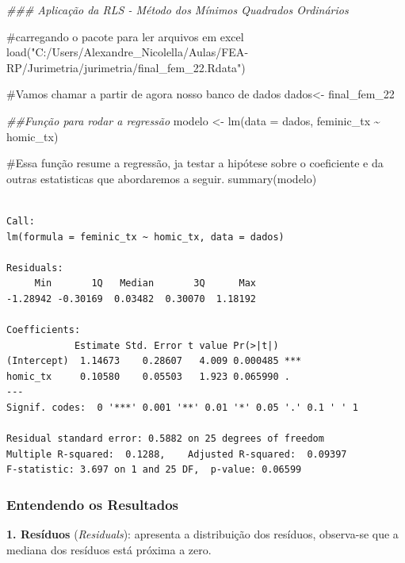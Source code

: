 \documentclass[
  letterpaper,
  DIV=11,
  numbers=noendperiod]{scrreprt}
\newenvironment{Shaded}{\begin{snugshade}}{\end{snugshade}}
\newcommand{\AttributeTok}[1]{\textcolor[rgb]{0.40,0.45,0.13}{#1}}
\newcommand{\CommentTok}[1]{\textcolor[rgb]{0.37,0.37,0.37}{#1}}
\newcommand{\DocumentationTok}[1]{\textcolor[rgb]{0.37,0.37,0.37}{\textit{#1}}}
\newcommand{\FunctionTok}[1]{\textcolor[rgb]{0.28,0.35,0.67}{#1}}
\newcommand{\NormalTok}[1]{\textcolor[rgb]{0.00,0.23,0.31}{#1}}
\newcommand{\OtherTok}[1]{\textcolor[rgb]{0.00,0.23,0.31}{#1}}
\newcommand{\SpecialCharTok}[1]{\textcolor[rgb]{0.37,0.37,0.37}{#1}}
\newcommand{\StringTok}[1]{\textcolor[rgb]{0.13,0.47,0.30}{#1}}
\begin{document}
\begin{Shaded}
\begin{Highlighting}[]
\DocumentationTok{\#\#\# Aplicação da RLS {-} Método dos Mínimos Quadrados Ordinários}

\CommentTok{\#carregando o pacote para ler arquivos em excel}
\FunctionTok{load}\NormalTok{(}\StringTok{"C:/Users/Alexandre\_Nicolella/Aulas/FEA{-}RP/Jurimetria/jurimetria/final\_fem\_22.Rdata"}\NormalTok{)}

\CommentTok{\#Vamos chamar a partir de agora nosso banco de dados}
\NormalTok{dados}\OtherTok{\textless{}{-}}\NormalTok{ final\_fem\_22 }

\DocumentationTok{\#\#Função para rodar a regressão}
\NormalTok{modelo }\OtherTok{\textless{}{-}} \FunctionTok{lm}\NormalTok{(}\AttributeTok{data =}\NormalTok{ dados, feminic\_tx }\SpecialCharTok{\textasciitilde{}}\NormalTok{ homic\_tx)}


\CommentTok{\#Essa função resume a regressão, ja testar a hipótese sobre o coeficiente e da outras estatisticas que abordaremos a seguir.}
\FunctionTok{summary}\NormalTok{(modelo)}
\end{Highlighting}
\end{Shaded}

\begin{verbatim}

Call:
lm(formula = feminic_tx ~ homic_tx, data = dados)

Residuals:
     Min       1Q   Median       3Q      Max 
-1.28942 -0.30169  0.03482  0.30070  1.18192 

Coefficients:
            Estimate Std. Error t value Pr(>|t|)    
(Intercept)  1.14673    0.28607   4.009 0.000485 ***
homic_tx     0.10580    0.05503   1.923 0.065990 .  
---
Signif. codes:  0 '***' 0.001 '**' 0.01 '*' 0.05 '.' 0.1 ' ' 1

Residual standard error: 0.5882 on 25 degrees of freedom
Multiple R-squared:  0.1288,    Adjusted R-squared:  0.09397 
F-statistic: 3.697 on 1 and 25 DF,  p-value: 0.06599
\end{verbatim}

\subsubsection{Entendendo os Resultados}\label{entendendo-os-resultados}

\textbf{1. Resíduos} (\emph{Residuals}): apresenta a distribuição dos
resíduos, observa-se que a mediana dos resíduos está próxima a zero.
\end{document}
